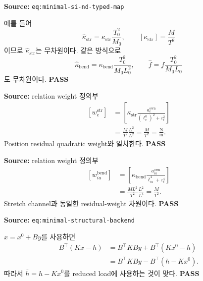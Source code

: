 \documentclass[11pt]{article}
\newcommand{\src}[1]{\textcolor{CoreBlue}{\nolinkurl{#1}}}
\newcommand{\pass}{\textcolor{SafeGreen}{\textbf{PASS}}}
\begin{document}
\begin{tcolorbox}[breakable,colback=white,colframe=black!35,title=SI--nd typed map,fonttitle=\bfseries]
\textbf{Source:} \src{eq:minimal-si-nd-typed-map}

예를 들어
\[
\widehat\kappa_{\mathrm{str}}
=\kappa_{\mathrm{str}}\frac{T_0^2}{M_0},
\qquad
[\kappa_{\mathrm{str}}]=\frac{M}{T^2}
\]
이므로 $\widehat\kappa_{\mathrm{str}}$는 무차원이다. 같은 방식으로
\[
\widehat\kappa_{\mathrm{bend}}
=\kappa_{\mathrm{bend}}\frac{T_0^2}{M_0L_0^2},
\qquad
\widehat f=f\frac{T_0^2}{M_0L_0}
\]
도 무차원이다. \pass
\end{tcolorbox}

\begin{tcolorbox}[breakable,colback=white,colframe=black!35,title=Stretch weight,fonttitle=\bfseries]
\textbf{Source:} relation weight 정의부
\[
\begin{aligned}
[w_e^{\mathrm{str}}]
&=
\left[
\kappa_{\mathrm{str}}
\frac{a_e^{\mathrm{own}}}{(\ell_e^0)^2+\varepsilon_\ell^2}
\right]\\
&=
\frac{M}{T^2}\frac{L^2}{L^2}
=
\frac{M}{T^2}
=
\frac{\mathrm N}{\mathrm m}.
\end{aligned}
\]
Position residual quadratic weight와 일치한다. \pass
\end{tcolorbox}

\begin{tcolorbox}[breakable,colback=white,colframe=black!35,title=Bending weight,fonttitle=\bfseries]
\textbf{Source:} relation weight 정의부
\[
\begin{aligned}
[w_{ia}^{\mathrm{bend}}]
&=
\left[
\kappa_{\mathrm{bend}}
\frac{a_{ia}^{\mathrm{own}}}{\bar\ell_{ia}^{4}+\varepsilon_\ell^4}
\right]\\
&=
\frac{ML^2}{T^2}\frac{L^2}{L^4}
=
\frac{M}{T^2}.
\end{aligned}
\]
Stretch channel과 동일한 residual-weight 차원이다. \pass
\end{tcolorbox}

\begin{tcolorbox}[breakable,colback=white,colframe=black!35,title=Rest-offset structural load,fonttitle=\bfseries]
\textbf{Source:} \src{eq:minimal-structural-backend}

$x=x^0+By$를 사용하면
\[
\begin{aligned}
B^\top(Kx-h)
&=B^\top KBy+B^\top(Kx^0-h)\\
&=B^\top KBy-B^\top(h-Kx^0).
\end{aligned}
\]
따라서 $\bar h=h-Kx^0$를 reduced load에 사용하는 것이 맞다. \pass
\end{tcolorbox}
\end{document}
